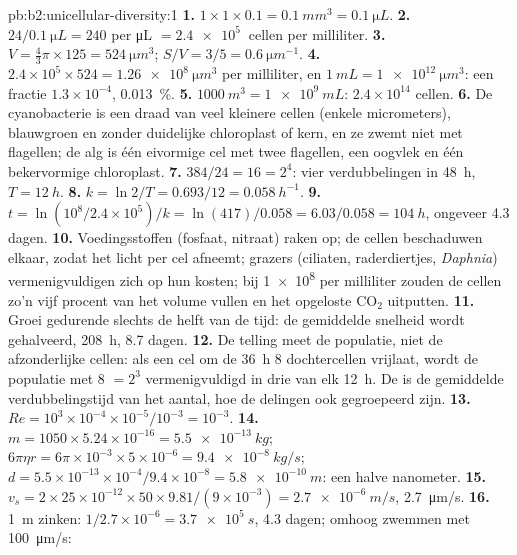 \begin{solution}{pb:b2:unicellular-diversity:1}
\textbf{1.} $1\times 1\times 0.1 = \qty{0.1}{mm^3} = \qty{0.1}{\micro L}$.
\textbf{2.} $24/\qty{0.1}{\micro L} = 240$ per \unit{\micro L} $=
\qty{2.4e5}{}$ cellen per milliliter.
\textbf{3.} $V = \tfrac{4}{3}\pi\times 125 = \qty{524}{\micro m^3}$;
$S/V = 3/5 = \qty{0.6}{\micro m^{-1}}$.
\textbf{4.} $2.4\times 10^5\times 524 = \qty{1.26e8}{\micro m^3}$ per
milliliter, en $\qty{1}{mL} = \qty{1e12}{\micro m^3}$: een fractie
$1.3\times 10^{-4}$, \qty{0.013}{\%}.
\textbf{5.} $\qty{1000}{m^3} = \qty{1e9}{mL}$: $2.4\times 10^{14}$
cellen.
\textbf{6.} De cyanobacterie is een draad van veel kleinere cellen
(enkele micrometers), blauwgroen en zonder duidelijke chloroplast of kern,
en ze zwemt niet met flagellen; de alg is één eivormige cel met twee
flagellen, een oogvlek en één bekervormige chloroplast.
\textbf{7.} $384/24 = 16 = 2^4$: vier verdubbelingen in \qty{48}{h},
$T = \qty{12}{h}$.
\textbf{8.} $k = \ln 2/T = 0.693/12 = \qty{0.058}{h^{-1}}$.
\textbf{9.} $t = \ln(10^8/2.4\times 10^5)/k = \ln(417)/0.058 =
6.03/0.058 = \qty{104}{h}$, ongeveer 4.3 dagen.
\textbf{10.} Voedingsstoffen (fosfaat, nitraat) raken op; de cellen
beschaduwen elkaar, zodat het licht per cel afneemt; grazers (ciliaten,
raderdiertjes, \emph{Daphnia}) vermenigvuldigen zich op hun kosten; bij
\qty{1e8}{} per milliliter zouden de cellen zo'n vijf procent van het volume
vullen en het opgeloste $\mathrm{CO_2}$ uitputten.
\textbf{11.} Groei gedurende slechts de helft van de tijd: de gemiddelde
snelheid wordt gehalveerd, \qty{208}{h}, 8.7 dagen.
\textbf{12.} De telling meet de populatie, niet de afzonderlijke cellen:
als een cel om de \qty{36}{h} 8 dochtercellen vrijlaat, wordt de populatie
met 8 $= 2^3$ vermenigvuldigd in drie  van elk \qty{12}{h}.
De  is de gemiddelde verdubbelingstijd van het aantal, hoe
de delingen ook gegroepeerd zijn.
\textbf{13.} $Re = 10^3\times 10^{-4}\times 10^{-5}/10^{-3} = 10^{-3}$.
\textbf{14.} $m = 1050\times 5.24\times 10^{-16} = \qty{5.5e-13}{kg}$;
$6\pi\eta r = 6\pi\times 10^{-3}\times 5\times 10^{-6} =
\qty{9.4e-8}{kg/s}$; $d = 5.5\times 10^{-13}\times 10^{-4}/9.4\times
10^{-8} = \qty{5.8e-10}{m}$: een halve nanometer.
\textbf{15.} $v_s = 2\times 25\times 10^{-12}\times 50\times
9.81/(9\times 10^{-3}) = \qty{2.7e-6}{m/s}$, \qty{2.7}{\micro m/s}.
\textbf{16.} \qty{1}{m} zinken: $1/2.7\times 10^{-6} =
\qty{3.7e5}{s}$, 4.3 dagen; omhoog zwemmen met \qty{100}{\micro m/s}:

\end{solution}
